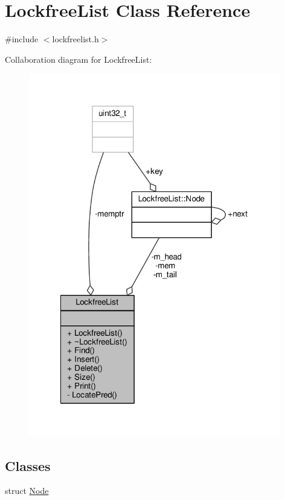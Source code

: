 \hypertarget{classLockfreeList}{\section{Lockfree\-List Class Reference}
\label{classLockfreeList}
}


{\ttfamily \#include $<$lockfreelist.\-h$>$}



Collaboration diagram for Lockfree\-List\-:
\nopagebreak
\begin{figure}[H]
\begin{center}
\leavevmode
\includegraphics[width=312pt]{classLockfreeList__coll__graph}
\end{center}
\end{figure}
\subsection*{Classes}
\begin{DoxyCompactItemize}
\item 
struct \hyperlink{structLockfreeList_1_1Node}{Node}
\end{DoxyCompactItemize}
